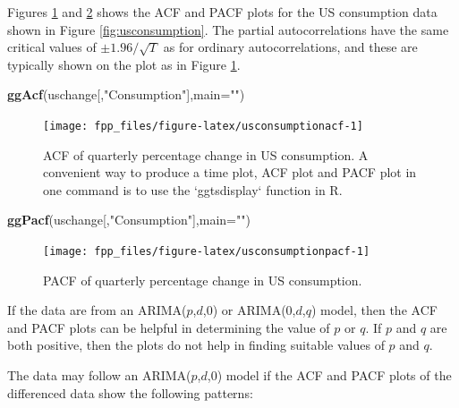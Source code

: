 \documentclass[]{book}
\newenvironment{Shaded}{\begin{snugshade}}{\end{snugshade}}
\newcommand{\DataTypeTok}[1]{\textcolor[rgb]{0.13,0.29,0.53}{#1}}
\newcommand{\KeywordTok}[1]{\textcolor[rgb]{0.13,0.29,0.53}{\textbf{#1}}}
\newcommand{\NormalTok}[1]{#1}
\newcommand{\StringTok}[1]{\textcolor[rgb]{0.31,0.60,0.02}{#1}}
\begin{document}
Figures \ref{fig:usconsumptionacf} and \ref{fig:usconsumptionpacf} shows the ACF and PACF plots for the US consumption data shown in Figure \ref{fig:usconsumption}. The partial autocorrelations have the same critical values of \(\pm 1.96/\sqrt{T}\) as for ordinary autocorrelations, and these are typically shown on the plot as in Figure \ref{fig:usconsumptionacf}.

\begin{Shaded}
\begin{Highlighting}[]
\KeywordTok{ggAcf}\NormalTok{(uschange[,}\StringTok{"Consumption"}\NormalTok{],}\DataTypeTok{main=}\StringTok{""}\NormalTok{)}
\end{Highlighting}
\end{Shaded}

\begin{figure}

{\centering \texttt{[image: fpp\_files/figure-latex/usconsumptionacf-1]} 

}

\caption{ACF of quarterly percentage change in US consumption. A convenient way to produce a time plot, ACF plot and PACF plot in one command is to use the `ggtsdisplay` function in R.}\label{fig:usconsumptionacf}
\end{figure}

\begin{Shaded}
\begin{Highlighting}[]
\KeywordTok{ggPacf}\NormalTok{(uschange[,}\StringTok{"Consumption"}\NormalTok{],}\DataTypeTok{main=}\StringTok{""}\NormalTok{)}
\end{Highlighting}
\end{Shaded}

\begin{figure}

{\centering \texttt{[image: fpp\_files/figure-latex/usconsumptionpacf-1]} 

}

\caption{PACF of quarterly percentage change in US consumption.}\label{fig:usconsumptionpacf}
\end{figure}

If the data are from an ARIMA(\(p\),\(d\),0) or ARIMA(0,\(d\),\(q\)) model, then the ACF and PACF plots can be helpful in determining the value of \(p\) or \(q\). If \(p\) and \(q\) are both positive, then the plots do not help in finding suitable values of \(p\) and \(q\).

The data may follow an ARIMA(\(p\),\(d\),0) model if the ACF and PACF plots of the differenced data show the following patterns:
\end{document}
